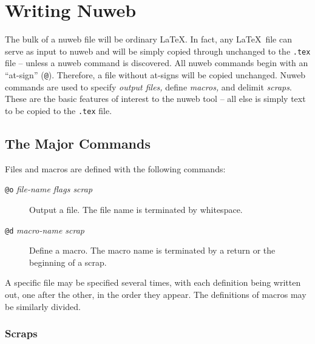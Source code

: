 \section{Writing Nuweb}

The bulk of a nuweb file will be ordinary \LaTeX\@. In fact, any \LaTeX\
file can serve as input to nuweb and will be simply copied through
unchanged to the \verb|.tex| file -- unless a nuweb command is
discovered. All nuweb commands begin with an ``at-sign'' (\verb|@|).
Therefore, a file without at-signs will be copied unchanged.
Nuweb commands are used to specify {\em output files,} define 
{\em macros,} and delimit {\em scraps}. These are the basic features
of interest to the nuweb tool -- all else is simply text to be copied
to the \verb|.tex| file.

\subsection{The Major Commands}

Files and macros are defined with the following commands:
\begin{description}
\item[{\tt @o} {\em file-name flags scrap\/}] Output a file. The file name is
  terminated by whitespace.
\item[{\tt @d} {\em macro-name scrap\/}] Define a macro. The macro name
  is terminated by a return or the beginning of a scrap.
\end{description}
A specific file may be specified several times, with each definition
being written out, one after the other, in the order they appear.
The definitions of macros may be similarly divided.

\subsubsection{Scraps}

